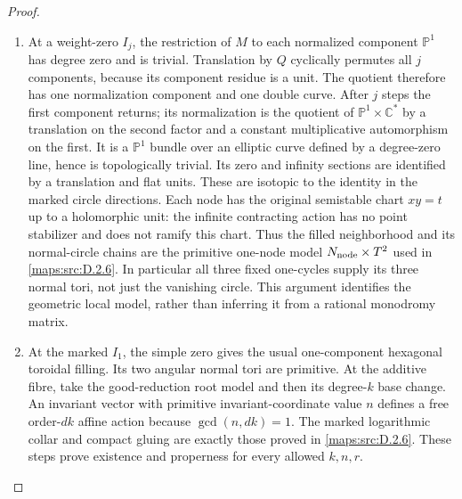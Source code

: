 \begin{proof}
\begin{enumerate}[label=\arabic*.,leftmargin=*]
\item At a weight-zero $I_j$, the restriction of $M$ to each normalized
component $\mathbb P^1$ has degree zero and is trivial.
Translation by $Q$ cyclically permutes all $j$ components,
because its component residue is a unit. The quotient therefore
has one normalization component and one double curve.
After $j$ steps the first component returns; its normalization
is the quotient of $\mathbb P^1\times\mathbb C^*$ by a
translation on the second factor and a constant multiplicative
automorphism on the first. It is a $\mathbb P^1$ bundle over an
elliptic curve defined by a degree-zero line, hence is
topologically trivial. Its zero and infinity sections are
identified by a translation and flat units. These are isotopic
to the identity in the marked circle directions.
Each node has the original semistable chart $xy=t$ up to a
holomorphic unit: the infinite contracting action has no point
stabilizer and does not ramify this chart.
Thus the filled neighborhood and its normal-circle chains are
the primitive one-node model $N_{\rm node}\times T^2$ used
in \ref{maps:src:D.2.6}. In particular all three fixed one-cycles supply its
three normal tori, not just the vanishing circle.
This argument identifies the geometric local model, rather
than inferring it from a rational monodromy matrix.

\item At the marked $I_1$, the simple zero gives the usual one-component
hexagonal toroidal filling. Its two angular normal tori are
primitive. At the additive fibre, take the good-reduction root
model and then its degree-$k$ base change. An invariant vector
with primitive invariant-coordinate value $n$ defines a free
order-$dk$ affine action because $\gcd(n,dk)=1$.
The marked logarithmic collar and compact gluing are exactly
those proved in \ref{maps:src:D.2.6}. These steps prove existence and properness
for every allowed $k,n,r$.


\end{enumerate}
\end{proof}
